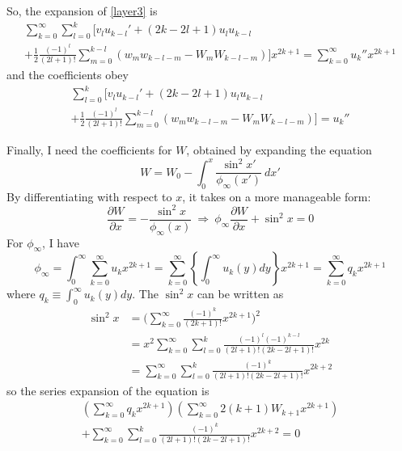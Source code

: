 \documentclass[10pt,a4paper]{report}
\begin{document}
So, the expansion of \eqref{layer3} is
\begin{multline*}
\sum_{k=0}^\infty \sum_{l=0}^k \bigg[v_l u_{k-l}' + (2k-2l+1)u_l u_{k-l} \\
+ \frac{1}{2} \frac{(-1)^l}{(2l+1)!} \sum_{m=0}^{k-l} \left(w_m w_{k-l-m} - W_m W_{k-l-m}\right) \bigg] x^{2k+1} = \sum_{k=0}^\infty u_k'' x^{2k+1}
\end{multline*}
and the coefficients obey
\begin{multline}
\sum_{l=0}^k \bigg[v_l u_{k-l}' + (2k-2l+1) u_l u_{k-l} \\
+ \frac{1}{2} \frac{(-1)^l}{(2l+1)!} \sum_{m=0}^{k-l} \left(w_m w_{k-l-m} - W_m W_{k-l-m}\right) \bigg] = u_k''
\end{multline}

Finally, I need the coefficients for $W$, obtained by expanding the equation
\begin{equation*}
W = W_0 - \int_0^x \frac{\sin^2 x'}{\phi_\infty (x')} \ dx'
\end{equation*}
By differentiating with respect to $x$, it takes on a more manageable form:
\begin{equation*}
\frac{\partial W}{\partial x} = - \frac{\sin^2 x}{\phi_\infty(x)} \ \Rightarrow \ \phi_\infty \frac{\partial W}{\partial x} + \sin^2 x = 0
\end{equation*}
For $\phi_\infty$, I have
\begin{equation*}
\phi_\infty = \int_0^\infty \sum_{k=0}^\infty u_k x^{2k+1} = \sum_{k=0}^\infty \left\{ \int_0^\infty u_k(y) dy \right\} x^{2k+1} = \sum_{k=0}^\infty q_k x^{2k+1}
\end{equation*}
where $q_k \equiv \int_0^\infty u_k(y) dy$. The $\sin^2 x$ can be written as
\begin{equation*}
\begin{split}
\sin^2 x & = \Bigg(\sum_{k=0}^\infty \frac{(-1)^k}{(2k+1)!} x^{2k+1} \Bigg)^2 \\
& = x^2 \sum_{k=0}^\infty \sum_{l=0}^k \frac{(-1)^l (-1)^{k-l}}{(2l+1)! (2k-2l+1)!} x^{2k} \\
& = \sum_{k=0}^\infty \sum_{l=0}^k \frac{(-1)^k}{(2l+1)! (2k-2l+1)!} x^{2k+2}
\end{split}
\end{equation*}
so the series expansion of the equation is
\begin{multline*}
\left( \sum_{k=0}^\infty  q_k x^{2k+1} \right) \left( \sum_{k=0}^\infty 2(k+1)W_{k+1} x^{2k+1} \right) \\
+ \sum_{k=0}^\infty \sum_{l=0}^k \frac{(-1)^k}{(2l+1)! (2k-2l+1)!} x^{2k+2} = 0
\end{multline*}
\end{document}
